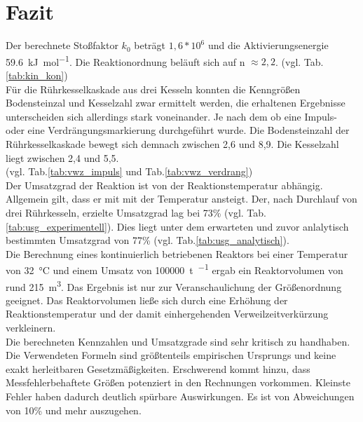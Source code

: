 \pagebreak
\section{Fazit}
\label{sec:fazit}

Der berechnete Stoßfaktor $k_0$ beträgt $1,6*10^6$ und die Aktivierungsenergie \SI{59,6}{\kilo\joule\per\mole}. Die Reaktionordnung beläuft sich auf n $\approx2,2$.  (vgl. Tab.\ref{tab:kin_kon})\\


Für die Rührkesselkaskade aus drei Kesseln konnten die Kenngrößen Bodensteinzal und Kesselzahl zwar ermittelt werden, die erhaltenen Ergebnisse unterscheiden sich allerdings stark voneinander. Je nach dem ob eine Impuls- oder eine Verdrängungsmarkierung durchgeführt wurde. Die Bodensteinzahl der Rührkesselkaskade bewegt sich demnach zwischen 2,6 und 8,9. Die Kesselzahl liegt zwischen 2,4 und 5,5.\\ (vgl. Tab.\ref{tab:vwz_impuls} und Tab.\ref{tab:vwz_verdrang})\\

Der Umsatzgrad der Reaktion ist von der Reaktionstemperatur abhängig. Allgemein gilt, dass er mit mit der Temperatur ansteigt. Der, nach Durchlauf von drei Rührkesseln, erzielte Umsatzgrad lag bei 73\% (vgl. Tab.\ref{tab:usg_experimentell}). Dies liegt unter dem erwarteten und zuvor anlalytisch bestimmten Umsatzgrad von 77\% (vgl. Tab.\ref{tab:usg_analytisch}). \\

Die Berechnung eines kontinuierlich betriebenen Reaktors bei einer Temperatur von \SI{32}{\degreeCelsius} und einem Umsatz von \SI{100000}{\tonne\per\year} ergab ein Reaktorvolumen von rund \SI{215}{\cubic\meter}. Das Ergebnis ist nur zur Veranschaulichung der Größenordnung geeignet. Das Reaktorvolumen ließe sich durch eine Erhöhung der Reaktionstemperatur und der damit einhergehenden Verweilzeitverkürzung verkleinern.\\ 

Die berechneten Kennzahlen und Umsatzgrade sind sehr kritisch zu handhaben. Die Verwendeten Formeln sind größtenteils empirischen Ursprungs und keine exakt herleitbaren Gesetzmäßigkeiten. Erschwerend kommt hinzu, dass Messfehlerbehaftete Größen potenziert in den Rechnungen vorkommen. Kleinste Fehler haben dadurch deutlich spürbare Auswirkungen. Es ist von Abweichungen von 10\% und mehr auszugehen.
 



